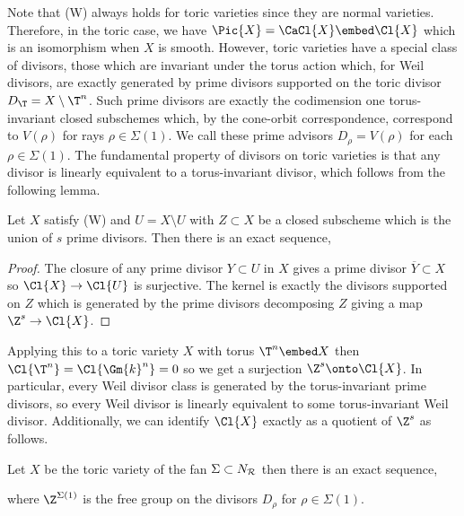 Note that (W) always holds for toric varieties since they are normal varieties. Therefore, in the toric case, we have $\Pic{X} = \CaCl{X} \embed \Cl{X}$ which is an isomorphism when $X$ is smooth. However, toric varieties have a special class of divisors, those which are invariant under the torus action which, for Weil divisors, are exactly generated by prime divisors supported on the toric divisor $D_\T = X \setminus \T^n$. Such prime divisors are exactly the codimension one torus-invariant closed subschemes which, by the cone-orbit correspondence, correspond to $V(\rho)$ for rays $\rho \in \Sigma(1)$. We call these prime advisors $D_\rho = V(\rho)$ for each $\rho \in \Sigma(1)$. The fundamental property of divisors on toric varieties is that any divisor is linearly equivalent to a torus-invariant divisor, which follows from the following lemma.

\begin{lemma}
Let $X$ satisfy (W) and $U = X \setminus U$ with $Z \subset X$ be a closed subscheme which is the union of $s$ prime divisors. Then there is an exact sequence,
\begin{center}
\end{center}
\end{lemma}

\begin{proof}
The closure of any prime divisor $Y \subset U$ in $X$ gives a prime divisor $\overline{Y} \subset X$ so $\Cl{X} \to \Cl{U}$ is surjective. The kernel is exactly the divisors supported on $Z$ which is generated by the prime divisors decomposing $Z$ giving a map $\Z^s \to \Cl{X}$.  
\end{proof}
\noindent
Applying this to a toric variety $X$ with torus $\T^n \embed X$ then $\Cl{\T^n} = \Cl{\Gm{k}^n} = 0$ so we get a surjection $\Z^s \onto \Cl{X}$. In particular, every Weil divisor class is generated by the torus-invariant prime divisors, so every Weil divisor is linearly equivalent to some torus-invariant Weil divisor. Additionally, we can identify $\Cl{X}$ exactly as a quotient of $\Z^s$ as follows. 

\begin{prop}
Let $X$ be the toric variety of the fan $\Sigma \subset N_{\mathcal{R}}$ then there is an exact sequence,
\begin{center}
\end{center}
where $\Z^{\Sigma(1)}$ is the free group on the divisors $D_\rho$ for $\rho \in \Sigma(1)$. 
\end{prop}

